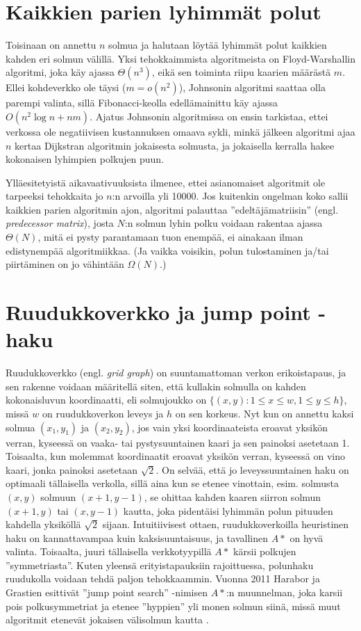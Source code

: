 \documentclass[finnish]{tktltiki2}
\theoremstyle{definition}
\theoremstyle{remark}
\begin{document}
\section{Kaikkien parien lyhimmät polut}
Toisinaan on annettu $n$ solmua ja halutaan löytää lyhimmät polut kaikkien kahden eri solmun välillä. Yksi tehokkaimmista algoritmeista on Floyd-Warshallin algoritmi, joka käy ajassa $\Theta(n^3)$, eikä sen toiminta riipu kaarien määrästä $m$. Ellei kohdeverkko ole täysi ($m = o(n^2)$), Johnsonin algoritmi saattaa olla parempi valinta, sillä Fibonacci-keolla edellämainittu käy ajassa $O(n^2 \log n + nm)$. Ajatus Johnsonin algoritmissa on ensin tarkistaa, ettei verkossa ole negatiivisen kustannuksen omaava sykli, minkä jälkeen algoritmi ajaa $n$ kertaa Dijkstran algoritmin jokaisesta solmusta, ja jokaisella kerralla hakee kokonaisen lyhimpien polkujen puun. 

Ylläesitetyistä aikavaativuuksista ilmenee, ettei asianomaiset algoritmit ole tarpeeksi tehokkaita jo $n$:n arvoilla yli 10000. Jos kuitenkin ongelman koko sallii kaikkien parien algoritmin ajon, algoritmi palauttaa ''edeltäjämatriisin'' (engl. \textit{predecessor matrix}), josta $N$:n solmun lyhin polku voidaan rakentaa ajassa $\Theta(N)$, mitä ei pysty parantamaan tuon enempää, ei ainakaan ilman edistynempää algoritmiikkaa. (Ja vaikka voisikin, polun tulostaminen ja/tai piirtäminen on jo vähintään $\Omega(N)$.)

\section{Ruudukkoverkko ja jump point -haku}
Ruudukkoverkko (engl. \textit{grid graph}) on suuntamattoman verkon erikoistapaus, ja sen rakenne voidaan määritellä siten, että kullakin solmulla on kahden kokonaisluvun koordinaatti, eli solmujoukko on $\{ (x, y) \colon 1 \leq x \leq w, 1 \leq y \leq h \}$, missä $w$ on ruudukkoverkon leveys ja $h$ on sen korkeus. Nyt kun on annettu kaksi solmua $(x_1, y_1)$ ja $(x_2, y_2)$, jos vain yksi koordinaateista eroavat yksikön verran, kyseessä on vaaka- tai pystysuuntainen kaari ja sen painoksi asetetaan 1. Toisaalta, kun molemmat koordinaatit eroavat yksikön verran, kyseessä on vino kaari, jonka painoksi asetetaan $\sqrt{2}$. On selvää, että jo leveyssuuntainen haku on optimaali tällaisella verkolla, sillä aina kun se etenee vinottain, esim. solmusta $(x, y)$ solmuun $(x + 1, y - 1)$, se ohittaa kahden kaaren siirron solmun $(x + 1, y)$ tai $(x, y - 1)$ kautta, joka pidentäisi lyhimmän polun pituuden kahdella yksiköllä $\sqrt{2}$ sijaan. Intuitiivisest ottaen, ruudukkoverkoilla heuristinen haku on kannattavampaa kuin kaksisuuntaisuus, ja tavallinen $A\ast$ on hyvä valinta. Toisaalta, juuri tällaisella verkkotyypillä $A\ast$ kärsii polkujen ''symmetriasta''. Kuten yleensä erityistapauksiin rajoittuessa, polunhaku ruudukolla voidaan tehdä paljon tehokkaammin. Vuonna 2011 Harabor ja Grastien esittivät ''jump point search'' -nimisen $A\ast$:n muunnelman, joka karsii pois polkusymmetriat ja etenee ''hyppien'' yli monen solmun siinä, missä muut algoritmit etenevät jokaisen välisolmun kautta \cite{Harabor11}.
\end{document}
